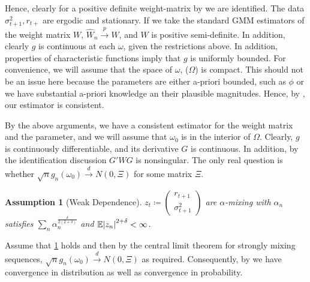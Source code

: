 \documentclass[11pt]{article}
\newtheorem{Assumption}{Assumption}[section]
\newcommand*{\E}{\mathbb{E}}
\newcommand*{\N}{N}
\newcommand*{\pto}{\stackrel{p}{\to}}
\newcommand*{\dto}{\stackrel{d}{\to}}
\DeclarePairedDelimiter\abs{\lvert}{\rvert}
\begin{document}
Hence, clearly for a positive definite weight-matrix by \textcite[Lemma 2.3]{newey1994large} we are identified.
The data $\sigma^2_{t+1}, r_{t+}$ are ergodic and stationary.
If we take the standard GMM estimators of the weight matrix $W$, $\widehat{W}_n \pto W$, and $W$ is positive
semi-definite.  
In addition, clearly $g$ is continuous at each $\omega$, given the restrictions above. 
In addition, properties of characteristic functions imply that $g$ is uniformly bounded. 
For convenience, we will assume that the space of $\omega$, ($\Omega$) is compact.
This should not be an issue here because the parameters  are either a-priori bounded, such as $\phi$ or we have
substantial a-priori knowledge an their plausible magnitudes.
Hence, by \textcite[Theroem 2.6]{newey1994large}, our estimator is consistent.

By the above arguments, we have a consistent estimator for the weight matrix and the parameter, and we will assume
that $\omega_0$ is in the interior of $\Omega$.
Clearly, $g$ is continuously differentiable, and its derivative $G$ is continuous.
In addition, by the identification discussion $G' W G$ is nonsingular.
The only real question is whether $\sqrt{n} g_n(\omega_0) \dto \N(0, \Xi)$ for some matrix $\Xi$.

\begin{Assumption}[Weak Dependence]
    \label{assumption:weak_dependence}
$z_t \coloneqq \begin{pmatrix} r_{t+1} \\ \sigma^2_{t+1} \end{pmatrix}$ are $\alpha$-mixing with $\alpha_n$
    satisfies  $\sum_{n} \alpha_n^{\frac{\delta}{2(2 + \delta)}}$ and $\E\abs*{z_n}^{2+\delta} < \infty $.  
\end{Assumption}

Assume that \cref{assumption:weak_dependence} holds and then by the central limit theorem for strongly mixing
sequences, $\sqrt{n} g_n(\omega_0) \dto \N(0,\Xi)$ as required. 
Consequently, by \textcite[theorem 3.2]{newey1994large} we have convergence in distribution as well as convergence
in probability.


\printbibliography
\end{document}
